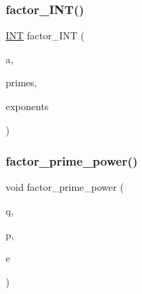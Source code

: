 \mbox{\label{number__theory_8_c_a856557582cb1be6218e52b9293854098}} 
\subsubsection{\texorpdfstring{factor\+\_\+\+I\+N\+T()}{factor\_INT()}}
{\footnotesize\ttfamily \mbox{\hyperlink{galois_8h_a09fddde158a3a20bd2dcadb609de11dc}{I\+NT}} factor\+\_\+\+I\+NT (\begin{DoxyParamCaption}\item[{\mbox{\hyperlink{galois_8h_a09fddde158a3a20bd2dcadb609de11dc}{I\+NT}}}]{a,  }\item[{\mbox{\hyperlink{galois_8h_a09fddde158a3a20bd2dcadb609de11dc}{I\+NT}} $\ast$\&}]{primes,  }\item[{\mbox{\hyperlink{galois_8h_a09fddde158a3a20bd2dcadb609de11dc}{I\+NT}} $\ast$\&}]{exponents }\end{DoxyParamCaption})}

\mbox{\label{number__theory_8_c_af87166fad1e9b91458c714e90f8cd399}} 
\subsubsection{\texorpdfstring{factor\+\_\+prime\+\_\+power()}{factor\_prime\_power()}}
{\footnotesize\ttfamily void factor\+\_\+prime\+\_\+power (\begin{DoxyParamCaption}\item[{\mbox{\hyperlink{galois_8h_a09fddde158a3a20bd2dcadb609de11dc}{I\+NT}}}]{q,  }\item[{\mbox{\hyperlink{galois_8h_a09fddde158a3a20bd2dcadb609de11dc}{I\+NT}} \&}]{p,  }\item[{\mbox{\hyperlink{galois_8h_a09fddde158a3a20bd2dcadb609de11dc}{I\+NT}} \&}]{e }\end{DoxyParamCaption})}

\mbox{\label{number__theory_8_c_a438157ad8fc60459800716752c8941b5}} 
